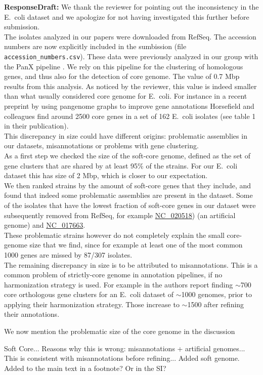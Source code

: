 \documentclass[aps,rmp,onecolumn]{revtex4-1}
\newcommand{\responsedraft}[1]{{\it {\color{purple}\textbf{ResponseDraft:} #1}}\vskip 5mm}
\begin{document}
\responsedraft{
      We thank the reviewer for pointing out the inconsistency in the E.~coli dataset and we apologize for not having investigated this further before submission.\\
      The isolates analyzed in our papers were downloaded from RefSeq. The accession numbers are now explicitly included in the sumbission (file \texttt{accession\_numbers.csv}). These data were previously analyzed in our group with the PanX pipeline \cite{ding2018panx}. We rely on this pipeline for the clustering of homologous genes, and thus also for the detection of core genome. The value of 0.7 Mbp results from this analysis. As noticed by the reviewer, this value is indeed smaller than what usually considered core genome for E.~coli.
      For instance in a recent preprint \cite{horsfield2023accurate} by using pangenome graphs to improve gene annotations Horsefield and colleagues find around 2500 core genes in a set of 162 E.~coli isolates (see table 1 in their publication).\\
      This discrepancy in size could have different origins: problematic assemblies in our datasets, misannotations or problems with gene clustering.\\
      As a first step we checked the size of the soft-core genome, defined as the set of gene clusters that are shared by at least 95\% of the strains. For our E.~coli dataset this has size of 2 Mbp, which is closer to our expectation.\\
      We then ranked strains by the amount of soft-core genes that they include, and found that indeed some problematic assemblies are present in the dataset. Some of the isolates that have the lowest fraction of soft-core genes in our dataset were subsequently removed from RefSeq, for example \href{https://www.ncbi.nlm.nih.gov/nuccore/NC_020518.1?report=genbank}{NC\_020518}) (an artificial genome) and  \href{https://www.ncbi.nlm.nih.gov/nuccore/NC_017663.1?report=genbank}{NC\_017663}.\\
      These problematic strains however do not completely explain the small core-genome size that we find, since for example at least one of the most common 1000 genes are missed by 87/307 isolates.\\
      The remaining discrepancy in size is to be attributed to misannotations.
      This is a common problem of strictly-core genome in annotation pipelines, if no harmonization strategy is used. For example in \cite{sutton2021pan} the authors report finding $\sim$700 core orthologous gene clusters for an E.~coli dataset of $\sim$1000 genomes, prior to applying their harmonization strategy. Those increase to $\sim$1500 after refining their annotations. 
      
      We now mention the problematic size of the core genome in the discussion

      Soft Core...
      Reasons why this is wrong: misannotations + artificial genomes... This is consistent with misannotations before refining...
      Added soft genome.
      Added to the main text in a footnote? Or in the SI?
}
\end{document}
